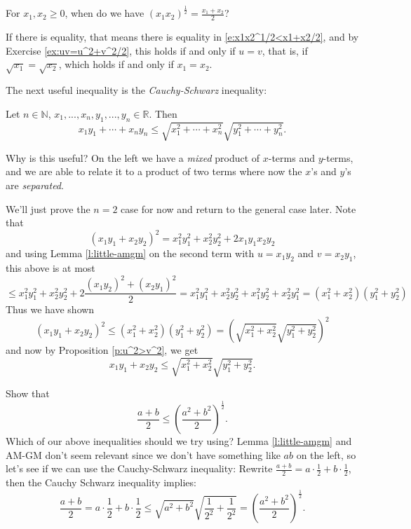 \documentclass[11pt,dvipsnames]{book}
\numberwithin{equation}{section} %
\numberwithin{figure}{section} %
\numberwithin{table}{section} %
\begin{document}
\begin{exercise}
For $x_{1},x_{2}\geq 0$, when do we have $(x_{1}x_{2})^{\frac{1}{2}}= \frac{x_{1}+x_{2}}{2}$?
\end{exercise}

\begin{solution}
If there is equality, that means there is equality in \eqref{e:x1x2^1/2<x1+x2/2}, and by Exercise \ref{ex:uv=u^2+v^2/2}, this holds if and only if $u=v$, that is, if $\sqrt{x_{1}}=\sqrt{x_{2}}$, which holds if and only if $x_{1}=x_{2}$.
\end{solution}

The next useful inequality is the {\it Cauchy-Schwarz} inequality:

\begin{theorem}
Let $n\in\mathbb{N}$,  $x_{1},...,x_{n},y_{1},...,y_{n}\in\mathbb{R}$. Then
\[
x_{1}y_{1}+\cdots + x_{n}y_{n}
\leq \sqrt{x_{1}^2+\cdots + x_{n}^{2}} \sqrt{y_{1}^2+\cdots + y_{n}^{2}} .
\]

\end{theorem}

Why is this useful? On the left we have a {\it mixed} product of $x$-terms and $y$-terms, and we are able to relate it to a product of two terms where now the $x$'s and $y$'s are {\it separated}.

We'll just prove the $n=2$ case for now and return to the general case later. Note that
\[
(x_{1}y_{1}+x_{2}y_{2})^2
=x_{1}^2y_{1}^2+x_{2}^2y_{2}^2+2x_{1}y_{1}x_{2}y_{2}
\]
and using Lemma \ref{l:little-amgm} on the second term with $u=x_{1}y_{2}$ and $v=x_{2}y_{1}$, this above is at most 
\[
\leq x_{1}^2y_{1}^2+x_{2}^2y_{2}^2+2\frac{(x_{1}y_{2})^2+(x_{2}y_{1})^2}{2}
=x_{1}^2y_{1}^2+x_{2}^2y_{2}^2+x_{1}^2y_{2}^2+x_{2}^2y_{1}^2
=(x_{1}^2+x_{2}^2)(y_{1}^2+y_{2}^2)
\]
Thus we have shown 
\[
(x_{1}y_{1}+x_{2}y_{2})^2\leq (x_{1}^2+x_{2}^2)(y_{1}^2+y_{2}^2)
=\left(\sqrt{x_{1}^2+x_{2}^2}\sqrt{y_{1}^2+y_{2}^2}\right)^{2}
\]
and now by Proposition \ref{p:u^2>v^2}, we get 
\[
x_{1}y_{1}+x_{2}y_{2}\leq\sqrt{x_{1}^2+x_{2}^2}\sqrt{y_{1}^2+y_{2}^2}.
\]


\begin{example} Show that 
\[
\frac{a+b}{2} \leq \left(\frac{a^2+b^2}{2}\right)^{\frac{1}{2}}.
\]
Which of our above inequalities should we try using? Lemma \ref{l:little-amgm} and AM-GM don't seem relevant since we don't have something like $ab$ on the left, so let's see if we can use the Cauchy-Schwarz inequality: Rewrite $\frac{a+b}{2}=a\cdot \frac{1}{2} +b\cdot\frac{1}{2}$, then the Cauchy Schwarz inequality implies:
\[
\frac{a+b}{2} = a\cdot\frac{1}{2} + b\cdot\frac{1}{2} \leq \sqrt{a^2+b^2}\sqrt{\frac{1}{2^{2}}+\frac{1}{2^{2}}}
=\left(\frac{a^2+b^2}{2}\right)^{\frac{1}{2}}.
\]
\end{example}
\end{document}
